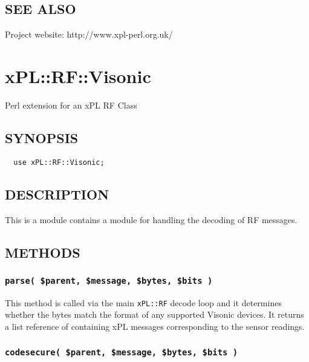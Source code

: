 \documentclass[12pt,a4paper]{article}
\begin{document}
\subsection*{SEE ALSO\label{xPL::RF::RFXSensor_SEE_ALSO}}


Project website: http://www.xpl-perl.org.uk/

\newpage
\section{xPL::RF::Visonic\label{xPL::RF::Visonic}}


Perl extension for an xPL RF Class

\subsection*{SYNOPSIS\label{xPL::RF::Visonic_SYNOPSIS}}
\begin{verbatim}
  use xPL::RF::Visonic;
\end{verbatim}
\subsection*{DESCRIPTION\label{xPL::RF::Visonic_DESCRIPTION}}


This is a module contains a module for handling the decoding of RF
messages.

\subsection*{METHODS\label{xPL::RF::Visonic_METHODS}}
\subsubsection*{\texttt{parse( \$parent, \$message, \$bytes, \$bits )}\label{xPL::RF::Visonic_parse_parent_message_bytes_bits_}}


This method is called via the main \texttt{xPL::RF} decode loop and it
determines whether the bytes match the format of any supported Visonic
devices.  It returns a list reference of containing xPL messages
corresponding to the sensor readings.

\subsubsection*{\texttt{codesecure( \$parent, \$message, \$bytes, \$bits )}\label{xPL::RF::Visonic_codesecure_parent_message_bytes_bits_}}
\end{document}

